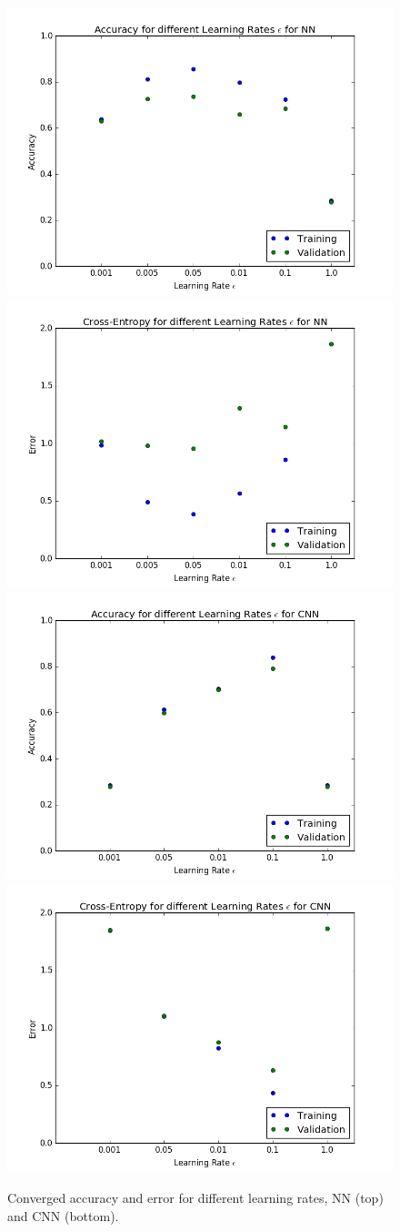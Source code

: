 \documentclass[12pt]{article}
\begin{document}
\begin{figure}[!htb]
\centering
\includegraphics[width=0.4\linewidth]{32/eps/nn/Accuracy.png}
\includegraphics[width=0.4\linewidth]{32/eps/nn/Error.png}
\includegraphics[width=0.4\linewidth]{32/eps/cnn/Accuracy.png}
\includegraphics[width=0.4\linewidth]{32/eps/cnn/Error.png}
\vspace{-0.1in}
\caption{Converged accuracy and error for different learning rates, NN (top) and CNN (bottom).}
\label{f32}
\vspace{-0.1in}
\end{figure}
\end{document}
